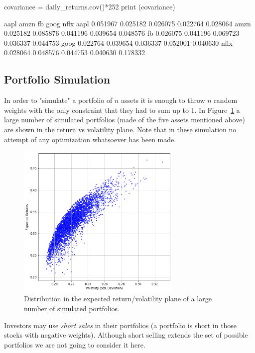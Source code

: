 \begin{ipython}
covariance = daily_returns.cov()*252
print (covariance)
\end{ipython}
\begin{ioutput}
          aapl      amzn        fb      goog      nflx
aapl  0.051967  0.025182  0.026075  0.022764  0.028064
amzn  0.025182  0.085876  0.041196  0.039654  0.048576
fb    0.026075  0.041196  0.069723  0.036337  0.044753
goog  0.022764  0.039654  0.036337  0.052001  0.040630
nflx  0.028064  0.048576  0.044753  0.040630  0.178332
\end{ioutput}
    
\subsection{Portfolio Simulation}
In order to "simulate" a portfolio of $n$ assets it is enough to throw $n$ random weights with the only constraint that they had to sum up to 1. 
In Figure~\ref{fig:mc_portfolio} a large number of simulated portfolios (made of the five assets mentioned above) are shown in the return vs volatility plane. 
Note that in these simulation no attempt of any optimization whatsoever has been made.

\begin{figure}[hbtp]
\centering
\includegraphics[width=0.7\textwidth]{figures/return_variance}
\caption{Distribution in the expected return/volatility plane of a large number of simulated portfolios.}
\label{fig:mc_portfolio}
\end{figure}

Investors may use \emph{short sales} in their portfolios (a portfolio is short in those stocks with negative weights). 
Although short selling extends the set of possible portfolios we are not going to consider it here.


